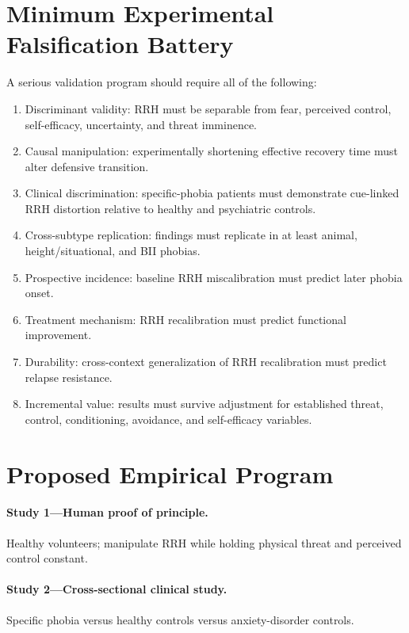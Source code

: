 \documentclass[11pt]{article}
\begin{document}
\section{Minimum Experimental Falsification Battery}

A serious validation program should require all of the following:
\begin{enumerate}[label=\arabic*.]
\item Discriminant validity: RRH must be separable from fear, perceived control, self-efficacy, uncertainty, and threat imminence.
\item Causal manipulation: experimentally shortening effective recovery time must alter defensive transition.
\item Clinical discrimination: specific-phobia patients must demonstrate cue-linked RRH distortion relative to healthy and psychiatric controls.
\item Cross-subtype replication: findings must replicate in at least animal, height/situational, and BII phobias.
\item Prospective incidence: baseline RRH miscalibration must predict later phobia onset.
\item Treatment mechanism: RRH recalibration must predict functional improvement.
\item Durability: cross-context generalization of RRH recalibration must predict relapse resistance.
\item Incremental value: results must survive adjustment for established threat, control, conditioning, avoidance, and self-efficacy variables.
\end{enumerate}

\section{Proposed Empirical Program}

\paragraph{Study 1---Human proof of principle.} Healthy volunteers; manipulate RRH while holding physical threat and perceived control constant.

\paragraph{Study 2---Cross-sectional clinical study.} Specific phobia versus healthy controls versus anxiety-disorder controls.
\end{document}
